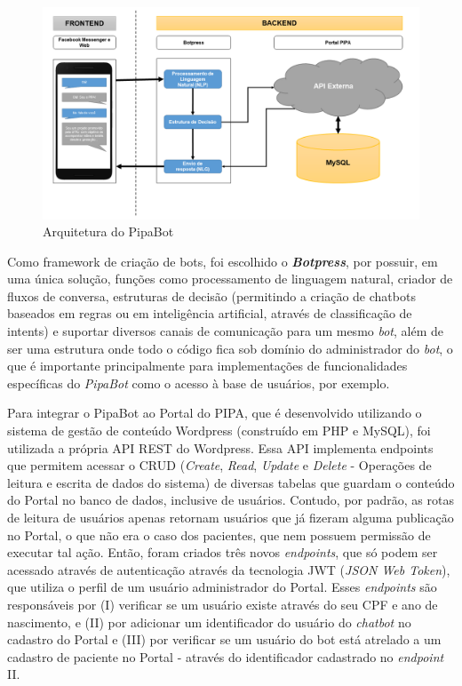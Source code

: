 	  \begin{figure}[h!]
	  	\begin{center}
		  	\includegraphics[width=1\linewidth]{images/arquitetura-pipabot.png}
			\caption{Arquitetura do PipaBot}
			\label{fig:arquitetura}
	  	\end{center}
	  \end{figure}
  
  Como framework de criação de bots, foi escolhido o \textbf{\textit{Botpress}}, por possuir, em uma única solução, funções como processamento de linguagem natural, criador de fluxos de conversa, estruturas de decisão (permitindo a criação de chatbots baseados em regras ou em inteligência artificial, através de classificação de intents) e suportar diversos canais de comunicação para um mesmo \textit{bot}, além de ser uma estrutura onde todo o código fica sob domínio do administrador do \textit{bot}, o que é importante principalmente para implementações de funcionalidades específicas do \textit{PipaBot} como o acesso à base de usuários, por exemplo.
  
  Para integrar o PipaBot ao Portal do PIPA, que é desenvolvido utilizando o sistema de gestão de conteúdo Wordpress (construído em PHP e MySQL), foi utilizada a própria API REST do Wordpress. Essa API implementa endpoints que permitem acessar o CRUD (\textit{Create}, \textit{Read}, \textit{Update} e \textit{Delete} - Operações de leitura e escrita de dados do sistema) de diversas tabelas que guardam o conteúdo do Portal no banco de dados, inclusive de usuários. Contudo, por padrão, as rotas de leitura de usuários apenas retornam usuários que já fizeram alguma publicação no Portal, o que não era o caso dos pacientes, que nem possuem permissão de executar tal ação. Então, foram criados três novos \textit{endpoints}, que só podem ser acessado através de autenticação através da tecnologia JWT (\textit{JSON Web Token}), que utiliza o perfil de um usuário administrador do Portal. Esses \textit{endpoints} são responsáveis por (I) verificar se um usuário existe através do seu CPF e ano de nascimento, e (II) por adicionar um identificador do usuário do \textit{chatbot} no cadastro do Portal e (III) por verificar se um usuário do bot está atrelado a um cadastro de paciente no Portal - através do identificador cadastrado no \textit{endpoint} II. 
  
